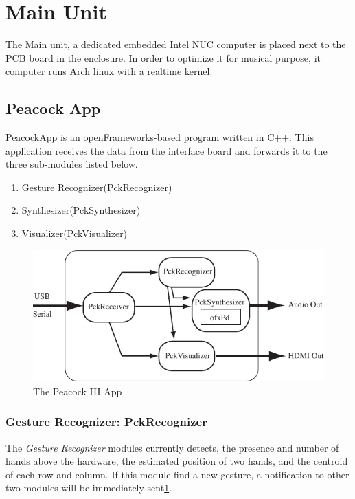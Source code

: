 \documentclass{nime-alternate}
\begin{document}
\section{Main Unit} %
The Main unit, a dedicated embedded Intel NUC computer\cite{intel:nuc} is placed next to the PCB board in the enclosure. In order to optimize it for musical purpose, it computer runs Arch linux with a realtime kernel.

\subsection{Peacock App}

PeacockApp is an openFrameworks\cite{openframeworks}-based program written in C++. This application receives the data from the interface board and forwards it to the three sub-modules listed below. 

\begin{enumerate}
       \item Gesture Recognizer(PckRecognizer)
       \item Synthesizer(PckSynthesizer)
       \item Visualizer(PckVisualizer)
\end{enumerate}


\begin{figure}[htbp]
       \begin{center}
              \includegraphics[width=1\columnwidth]{Peacock_app.pdf}
       \end{center}
       \caption{The Peacock III App}
       \label{fig:modules}
\end{figure}

\subsubsection{Gesture Recognizer: PckRecognizer}

The {\it Gesture Recognizer} modules currently detects, the presence and number of hands above the hardware, the estimated position of two hands, and the centroid of each row and column.  If this module find a new gesture, a notification to other two modules will be immediately sent\ref{fig:modules}.
\end{document}
